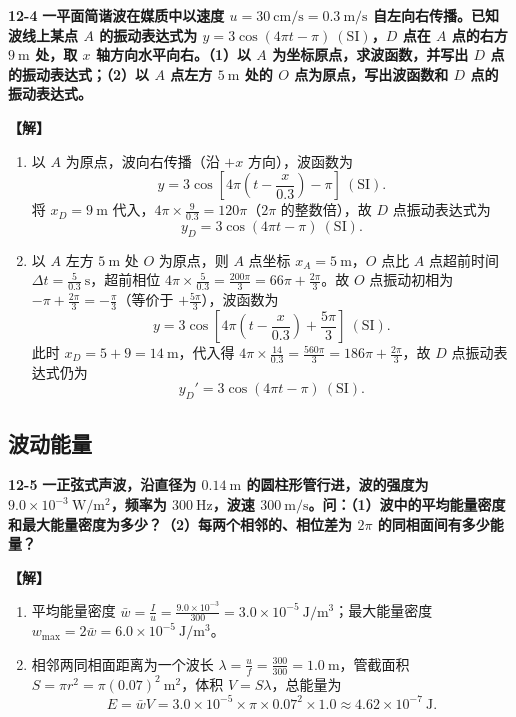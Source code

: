 \documentclass[zihao=5,a4paper,UTF8]{ctexart}
\newenvironment{prob}[2]{%
    \par\vspace{6pt}\noindent\textbf{\color{navy}#1} \textbf{#2}\par\nopagebreak\vspace{2pt}%
}{%
    \par\vspace{4pt}%
}
\newcommand{\sol}{\noindent\textbf{\color{tealaccent}【解】}\ }
\begin{document}
\begin{prob}{12-4}{一平面简谐波在媒质中以速度 $u=30\ \mathrm{cm/s} = 0.3\ \mathrm{m/s}$ 自左向右传播。已知波线上某点 $A$ 的振动表达式为 $y = 3\cos(4\pi t - \pi)\ (\mathrm{SI})$，$D$ 点在 $A$ 点的右方 $9\ \mathrm{m}$ 处，取 $x$ 轴方向水平向右。（1）以 $A$ 为坐标原点，求波函数，并写出 $D$ 点的振动表达式；（2）以 $A$ 点左方 $5\ \mathrm{m}$ 处的 $O$ 点为原点，写出波函数和 $D$ 点的振动表达式。}
\sol
\begin{enumerate}[leftmargin=2em, itemsep=2pt]
    \item 以 $A$ 为原点，波向右传播（沿 $+x$ 方向），波函数为
    \[
        y = 3\cos\left[4\pi\left(t - \frac{x}{0.3}\right) - \pi\right]\ (\mathrm{SI}).
    \]
    将 $x_D = 9\ \mathrm{m}$ 代入，$4\pi\times\frac{9}{0.3} = 120\pi$（$2\pi$ 的整数倍），故 $D$ 点振动表达式为
    \[
        y_D = 3\cos(4\pi t - \pi)\ (\mathrm{SI}).
    \]
    \item 以 $A$ 左方 $5\ \mathrm{m}$ 处 $O$ 为原点，则 $A$ 点坐标 $x_A = 5\ \mathrm{m}$，$O$ 点比 $A$ 点超前时间 $\Delta t = \frac{5}{0.3}\ \mathrm{s}$，超前相位 $4\pi\times\frac{5}{0.3} = \frac{200\pi}{3} = 66\pi + \frac{2\pi}{3}$。故 $O$ 点振动初相为 $-\pi + \frac{2\pi}{3} = -\frac{\pi}{3}$（等价于 $+\frac{5\pi}{3}$），波函数为
    \[
        y = 3\cos\left[4\pi\left(t - \frac{x}{0.3}\right) + \frac{5\pi}{3}\right]\ (\mathrm{SI}).
    \]
    此时 $x_D = 5 + 9 = 14\ \mathrm{m}$，代入得 $4\pi\times\frac{14}{0.3} = \frac{560\pi}{3} = 186\pi + \frac{2\pi}{3}$，故 $D$ 点振动表达式仍为
    \[
        y_D' = 3\cos(4\pi t - \pi)\ (\mathrm{SI}).
    \]
\end{enumerate}
\end{prob}

\subsection{波动能量}

\begin{prob}{12-5}{一正弦式声波，沿直径为 $0.14\ \mathrm{m}$ 的圆柱形管行进，波的强度为 $9.0\times 10^{-3}\ \mathrm{W/m^2}$，频率为 $300\ \mathrm{Hz}$，波速 $300\ \mathrm{m/s}$。问：（1）波中的平均能量密度和最大能量密度为多少？（2）每两个相邻的、相位差为 $2\pi$ 的同相面间有多少能量？}
\sol
\begin{enumerate}[leftmargin=2em, itemsep=2pt]
    \item 平均能量密度 $\bar{w} = \frac{I}{u} = \frac{9.0\times 10^{-3}}{300} = 3.0\times 10^{-5}\ \mathrm{J/m^3}$；最大能量密度 $w_{\max} = 2\bar{w} = 6.0\times 10^{-5}\ \mathrm{J/m^3}$。
    \item 相邻两同相面距离为一个波长 $\lambda = \frac{u}{f} = \frac{300}{300} = 1.0\ \mathrm{m}$，管截面积 $S = \pi r^2 = \pi(0.07)^2\ \mathrm{m^2}$，体积 $V = S\lambda$，总能量为
    \[
        E = \bar{w}V = 3.0\times 10^{-5}\times \pi\times 0.07^2\times 1.0 \approx 4.62\times 10^{-7}\ \mathrm{J}.
    \]
\end{enumerate}
\end{prob}
\end{document}
